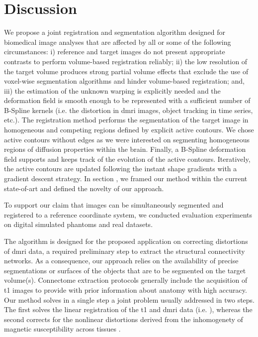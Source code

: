 \section*{Discussion}
\label{sec:discussion}
We propose a joint registration and segmentation algorithm designed for biomedical
  image analyses that are affected by all or some of the following circumstances:
  i) reference and target images do not present appropriate contrasts to
  	perform volume-based registration reliably;
  ii) the low resolution of the target volume produces strong partial volume effects
  	that exclude the use of voxel-wise segmentation algorithms and hinder volume-based
  	registration; and,
  iii) the estimation of the unknown warping is explicitly needed and the
    deformation field is smooth enough to be represented with a sufficient number
  	of B-Spline kernels (i.e. the distortion in \gls*{dmri} images,
  	object tracking in time series, etc.).
The registration method performs the segmentation of the target image in homogeneous
  and competing regions defined by explicit active contours.
We chose active contours without edges as we were interested on segmenting homogeneous
  regions of diffusion properties within the brain.
Finally, a B-Spline deformation field supports and keeps track of the evolution of the
  active contours.
Iteratively, the active contours are updated following the instant shape gradients
  \citep{herbulot_segmentation_2006} with a gradient descent strategy.
In section , we framed our method within the current
  state-of-art and defined the novelty of our approach.

To support our claim that images can be simultaneously segmented and registered to a
  reference coordinate system, we conducted evaluation experiments on digital
  simulated phantoms and real datasets.

The algorithm is designed for the proposed application on correcting distortions of
  \gls*{dmri} data, a required preliminary step to extract the structural connectivity
  networks.
As a consequence, our approach relies on the availability of precise segmentations or
  surfaces of the objects that are to be segmented on the target volume(s).
Connectome extraction protocols generally include the acquisition of \gls*{t1} images
  to provide with prior information about anatomy with high accuracy.
Our method solves in a single step a joint problem usually addressed in two steps.
The first solves the linear registration of the \gls*{t1} and \gls*{dmri} data (i.e.
  \cite{greve_accurate_2009}), whereas the second corrects for the nonlinear distortions
  derived from the inhomogenety of magnetic susceptibility across tissues
  \citep{jezzard_correction_1995}.


